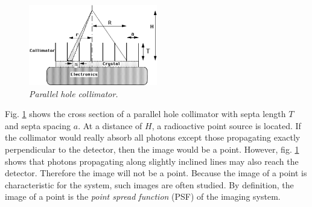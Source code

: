 \documentclass[11pt,oneside]{book}
\begin{document}
\begin{figure}[tb]
\centering
\includegraphics[width=0.5\textwidth]{figs/fig_collimator_calc.pdf}
\caption{\emph{Parallel hole collimator.}}
\label{fig:collimator_calc}
\end{figure}

Fig. \ref{fig:collimator_calc} shows the cross section of a parallel
hole collimator with septa length $T$ and septa spacing $a$. At a
distance of $H$, a radioactive point source is located.  If the
collimator would really absorb all photons except those propagating
exactly perpendicular to the detector, then the image would be a
point.  However, fig. \ref{fig:collimator_calc} shows that photons
propagating along slightly inclined lines may also reach the detector.
Therefore the image will not be a point. Because the image of a point
is characteristic for the system, such images are often studied. By
definition, the image of a point is the {\em point spread function}
(PSF) of the imaging system. 
\end{document}
